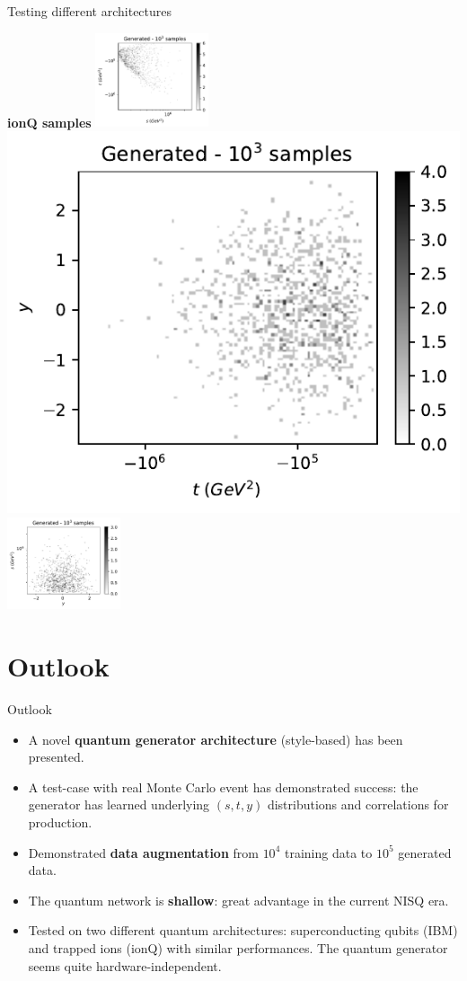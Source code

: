 \documentclass[11pt,aspectratio=169]{beamer}
\begin{document}
\begin{frame}{Testing different architectures}
    \begin{multicols*}{4}
        { \vfill 
        \textbf{ionQ samples}
        }
        \includegraphics[width=0.25\textwidth]{figures/plots/hardware/ionQ/s-t_FAKE_ionQ_1k.pdf}
        \includegraphics[width=0.25 \textwidth]{figures/plots/hardware/ionQ/t-y_FAKE_ionQ_1k.pdf}
        \includegraphics[width=0.25\textwidth]{figures/plots/hardware/ionQ/y-s_FAKE_ionQ_1k.pdf}
    \end{multicols*}
\end{frame}

\section{Outlook}
\begin{frame}{Outlook}
    \begin{itemize}
        \item A novel \textbf{quantum generator architecture} (style-based) has been presented.
        \item A test-case with real Monte Carlo event has demonstrated success: the generator has
        learned underlying $(s, t, y)$ distributions and correlations for production.
        \item Demonstrated \textbf{data augmentation} from $10^4$ training data to $10^5$ generated data.
        \item The quantum network is \textbf{shallow}: great advantage in the current NISQ era.
        \item Tested on two different quantum architectures: superconducting qubits (IBM) and
        trapped ions (ionQ) with similar performances. The quantum generator seems quite
        hardware-independent.
    \end{itemize}
\end{frame}
\end{document}
